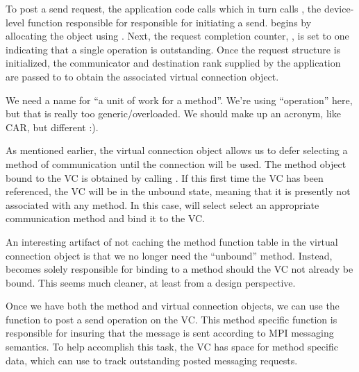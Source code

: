 
To post a send request, the application code calls  which in
turn calls , the device-level function responsible for
responsible for initiating a send.   begins by allocating the
 object using .  Next, the
request completion counter, , is set to one indicating
that a single operation is outstanding.  Once the request structure is
initialized, the communicator and destination rank supplied by the application
are passed to  to obtain the associated virtual
connection object.

\begin{cmt}
  We need a name for ``a unit of work for a method''.  We're using
  ``operation'' here, but that is really too generic/overloaded.  We should
  make up an acronym, like CAR, but different :).
\end{cmt}

As mentioned earlier, the virtual connection object allows us to defer
selecting a method of communication until the connection will be used.  The
method object bound to the VC is obtained by calling
.  If this first time the VC has been referenced,
the VC will be in the unbound state, meaning that it is presently not
associated with any method.  In this case,  will
select select an appropriate communication method and bind it to the VC.

\begin{cmt}
  An interesting artifact of not caching the method function table in the
  virtual connection object is that we no longer need the ``unbound'' method.
  Instead,  becomes solely responsible for binding to
  a method should the VC not already be bound.  This seems much cleaner, at
  least from a design perspective.
\end{cmt}

Once we have both the method and virtual connection objects, we can use the
 function to post a send operation on the VC.  This
method specific function is responsible for insuring that the message is sent
according to MPI messaging semantics.  To help accomplish this task, the VC has
space for method specific data, which  can use to track
outstanding posted messaging requests.

